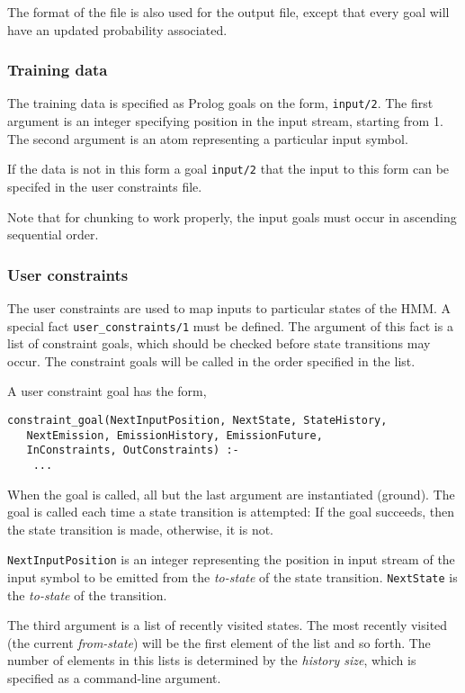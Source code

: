 \documentclass{article}
\begin{document}
The format of the file is also used for the output file, except that every goal will have an updated probability associated.

\subsubsection{Training data}
\label{sec:training_data_file}

The training data is specified as Prolog goals on the form, \texttt{input/2}. The first argument is an integer specifying position in the input stream, starting from 1. The second 
argument is an atom representing a particular input symbol.

If the data is not in this form a goal \texttt{input/2} that the input to this form can be specifed in the user constraints file.

Note that for chunking to work properly, the input goals must occur in ascending sequential order. 

\subsubsection{User constraints}
\label{sec:user_constraints}

The user constraints are used to map inputs to particular states of the HMM. A special fact \texttt{user\_constraints/1} must be defined.
The argument of this fact is a list of constraint goals, which should be checked before state transitions may occur. The constraint goals
will be called in the order specified in the list.

A user constraint goal has the form, 

\begin{verbatim}
constraint_goal(NextInputPosition, NextState, StateHistory,
   NextEmission, EmissionHistory, EmissionFuture,
   InConstraints, OutConstraints) :- 
    ... 
\end{verbatim}

When the goal is called, all but the last argument are instantiated (ground). The goal is called each time a state transition is attempted: If the goal succeeds, 
then the state transition is made, otherwise, it is not.

\texttt{NextInputPosition} is an integer representing the position in input stream of the input symbol to be emitted from the \emph{to-state} of the state transition.
\texttt{NextState} is the \emph{to-state} of the transition. 

The third argument is a list of recently visited states. The most recently visited (the current \emph{from-state}) will be the first element of the list and so forth. The
number of elements in this lists is determined by the \emph{history size}, which is specified as a command-line argument.
\end{document}
